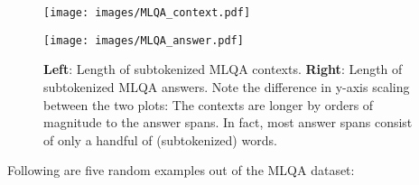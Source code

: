 \begin{figure}
  \begin{minipage}{0.45\linewidth}
  \vspace{0pt}
    \texttt{[image: images/MLQA\_context.pdf]}
  \end{minipage}
  \hfill
  \begin{minipage}{0.45\linewidth}
  \vspace{0pt}
    \texttt{[image: images/MLQA\_answer.pdf]}
  \end{minipage}
  \caption[MLQA Lengths]{\textbf{Left}: Length of subtokenized MLQA contexts.
                         \textbf{Right}: Length of subtokenized MLQA answers. Note the difference in y-axis scaling between the two plots:
                         The contexts are longer by orders of magnitude to the answer spans. In fact, most answer spans consist of only a handful of
                         (subtokenized) words.}
  \label{fig:mlqa-stats}
\end{figure}

Following are five random examples out of the MLQA dataset:

